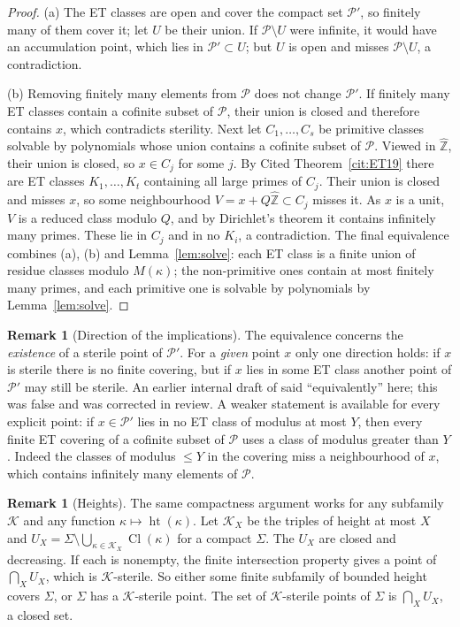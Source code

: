\documentclass[11pt,reqno]{amsart}
\theoremstyle{definition}
\newtheorem{remark}[theorem]{Remark}
\newcommand{\Z}{\mathbb Z}
\newcommand{\Zh}{\widehat{\Z}}
\newcommand{\Cl}{\operatorname{Cl}}
\begin{document}
\begin{proof}
(a) The ET classes are open and cover the compact set $\mathcal P'$, so
finitely many of them cover it; let $U$ be their union.  If
$\mathcal P\setminus U$ were infinite, it would have an accumulation
point, which lies in $\mathcal P'\subset U$; but $U$ is open and misses
$\mathcal P\setminus U$, a contradiction.

(b) Removing finitely many elements from $\mathcal P$ does not change
$\mathcal P'$.  If finitely many ET classes contain a cofinite subset of
$\mathcal P$, their union is closed and therefore contains $x$, which
contradicts sterility.  Next let $C_1,\dots,C_s$ be primitive classes
solvable by polynomials whose union contains a cofinite subset of
$\mathcal P$.  Viewed in $\Zh$, their union is closed, so $x\in C_j$ for
some $j$.  By Cited Theorem~\ref{cit:ET19} there are ET classes
$K_1,\dots,K_t$ containing all large primes of $C_j$.  Their union is
closed and misses $x$, so some neighbourhood $V=x+Q\Zh\subset C_j$
misses it.  As $x$ is a unit, $V$ is a reduced class modulo $Q$, and by
Dirichlet's theorem it contains infinitely many primes.  These lie in
$C_j$ and in no $K_i$, a contradiction.  The final equivalence combines
(a), (b) and Lemma~\ref{lem:solve}: each ET class is a finite union of
residue classes modulo $M(\kappa)$; the non-primitive ones contain at
most finitely many primes, and each primitive one is solvable by
polynomials by Lemma~\ref{lem:solve}.
\end{proof}

\begin{remark}[Direction of the implications]\label{rem:direction}
The equivalence concerns the \emph{existence} of a sterile point of
$\mathcal P'$.  For a \emph{given} point $x$ only one direction holds:
if $x$ is sterile there is no finite covering, but if $x$ lies in some
ET class another point of $\mathcal P'$ may still be sterile.  An earlier
internal draft of \cite{PM} said ``equivalently'' here; this was false
and was corrected in review.  A weaker statement is available for every
explicit point: if $x\in\mathcal P'$ lies in no ET class of modulus at
most $Y$, then every finite ET covering of a cofinite subset of $\mathcal
P$ uses a class of modulus greater than $Y$.  Indeed the classes of
modulus $\le Y$ in the covering miss a neighbourhood of $x$, which
contains infinitely many elements of $\mathcal P$.
\end{remark}

\begin{remark}[Heights]\label{rem:heights}
The same compactness argument works for any subfamily $\mathcal K$ and
any function $\kappa\mapsto\operatorname{ht}(\kappa)$.  Let
$\mathcal K_X$ be the triples of height at most $X$ and
$U_X=\Sigma\setminus\bigcup_{\kappa\in\mathcal K_X}\Cl(\kappa)$ for a
compact $\Sigma$.  The $U_X$ are closed and decreasing.  If each is
nonempty, the finite intersection property gives a point of $\bigcap_X
U_X$, which is $\mathcal K$-sterile.  So either some finite subfamily of
bounded height covers $\Sigma$, or $\Sigma$ has a $\mathcal K$-sterile
point.  The set of $\mathcal K$-sterile points of $\Sigma$ is
$\bigcap_XU_X$, a closed set.
\end{remark}
\end{document}

